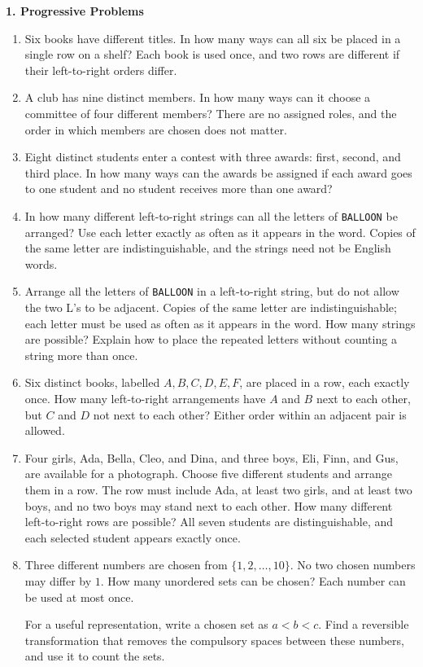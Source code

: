 \documentclass[11pt]{article}
\newcommand{\stageheading}[1]{%
  \par\Needspace{6\baselineskip}%
  \addvspace{.65\baselineskip}%
  {\centering\large\bfseries #1\par}%
  \nopagebreak[4]}
\begin{document}
\clearpage
\stageheading{1. Progressive Problems}

\begin{enumerate}[label=\textbf{\arabic*.}]
\item Six books have different titles. In how many ways can all six be
placed in a single row on a shelf? Each book is used once, and two rows
are different if their left-to-right orders differ.

\item A club has nine distinct members. In how many ways can it choose
a committee of four different members? There are no assigned roles, and
the order in which members are chosen does not matter.

\item Eight distinct students enter a contest with three awards: first,
second, and third place. In how many ways can the awards be assigned if
each award goes to one student and no student receives more than one award?

\item In how many different left-to-right strings can all the letters of
\texttt{BALLOON} be arranged? Use each letter exactly as often as it appears
in the word. Copies of the same letter are indistinguishable, and the
strings need not be English words.

\item Arrange all the letters of \texttt{BALLOON} in a left-to-right
string, but do not allow the two L's to be adjacent. Copies of the same
letter are indistinguishable; each letter must be used as often as it
appears in the word. How many strings are possible? Explain how to place
the repeated letters without counting a string more than once.

\item Six distinct books, labelled $A,B,C,D,E,F$, are placed in a row,
each exactly once. How many left-to-right arrangements have $A$ and $B$
next to each other, but $C$ and $D$ not next to each other? Either order
within an adjacent pair is allowed.

\item Four girls, Ada, Bella, Cleo, and Dina, and three boys, Eli, Finn,
and Gus, are available for a photograph. Choose five different students
and arrange them in a row. The row must include Ada, at least two girls,
and at least two boys, and no two boys may stand next to each other.
How many different left-to-right rows are possible? All seven students
are distinguishable, and each selected student appears exactly once.
\item Three different numbers are chosen from $\{1,2,\ldots,10\}$.
No two chosen numbers may differ by $1$. How many unordered sets can be
chosen? Each number can be used at most once.

For a useful representation, write a chosen set as $a<b<c$.
Find a reversible transformation that removes the compulsory spaces
between these numbers, and use it to count the sets.
\end{enumerate}
\end{document}
